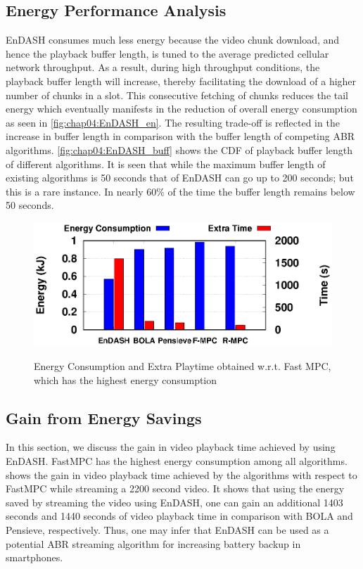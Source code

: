 \subsection{Energy Performance Analysis}
EnDASH consumes much less energy because the video chunk download, and hence the playback buffer length, is tuned to the average predicted cellular network throughput. As a result, during high throughput conditions, the playback buffer length will increase, thereby facilitating the download of a higher number of chunks in a slot. This consecutive fetching of chunks reduces the tail energy which eventually manifests in the reduction of overall energy consumption as seen in \fig\ref{fig:chap04:EnDASH_en}. The resulting trade-off is reflected in the increase in buffer length in comparison with the buffer length of competing \ac{ABR} algorithms.  \fig\ref{fig:chap04:EnDASH_buff} shows the \ac{CDF} of playback buffer length of different algorithms. It is seen that while the maximum buffer length of existing algorithms is 50 seconds that of EnDASH can go up to 200 seconds; but this is a rare instance. In nearly 60\% of the time the buffer length remains below 50 seconds.

\begin{figure}[ht]%
	\centering
	{\includegraphics[width=0.7\linewidth]{new_results/simres/EnergyConsumption}}
	\caption{Energy Consumption and Extra Playtime obtained w.r.t. Fast MPC, which has the highest energy consumption}\vspace*{-0.5cm}
	\label{fig:chap04:vid_time_save}
\end{figure}
\subsection{Gain from Energy Savings}
\indent In this section, we discuss the gain in video playback time achieved by using EnDASH. FastMPC has the highest energy consumption among all algorithms. \fig{\ref{fig:chap04:vid_time_save}} shows the gain in video playback time achieved by the algorithms with respect to FastMPC while streaming a 2200 second video. It shows that using the energy saved by streaming the video using EnDASH, one can gain an additional 1403 seconds and 1440 seconds of video playback time in comparison with BOLA and Pensieve, respectively. Thus, one may infer that EnDASH can be used as a potential \ac{ABR} streaming algorithm for increasing battery backup in smartphones.

